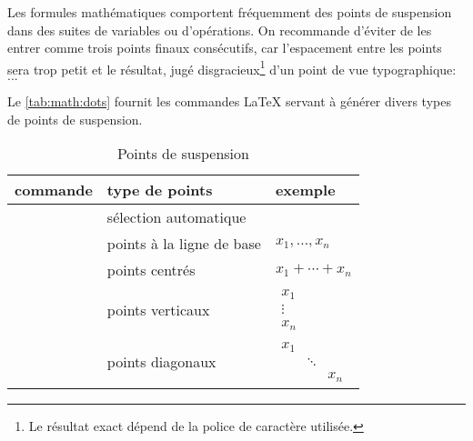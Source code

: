 Les formules mathématiques comportent fréquemment des points de
suspension dans des suites de variables ou d'opérations. On recommande
d'éviter de les entrer comme trois points finaux consécutifs, car
l'espacement entre les points sera trop petit et le résultat, jugé
disgracieux\footnote{%
  Le résultat exact dépend de la police de caractère utilisée.} %
d'un point de vue typographique: $...$

Le \autoref{tab:math:dots} fournit les commandes {\LaTeX} servant à
générer divers types de points de suspension.

\begin{table}
  \caption{Points de suspension}
  \label{tab:math:dots}
  \centering
  \begin{tabular}{lll}
    \toprule
    commande & type de points & exemple \\
    \midrule
    \cmd{\dots} &  sélection automatique \\
    \cmd{\ldots} & points à la ligne de base & $x_1, \ldots, x_n$ \\
    \cmd{\cdots} & points centrés & $x_1 + \cdots + x_n$ \\
    \cmd{\vdots} & points verticaux & $
                                      \begin{matrix}
                                        x_1 \\ \vdots \\ x_n
                                      \end{matrix}$ \\
    \cmd{\ddots} & points diagonaux & $
                                      \begin{matrix}
                                        x_1 &&\\ &\ddots& \\ && x_n
                                      \end{matrix}$ \\
    \bottomrule
  \end{tabular}
\end{table}

